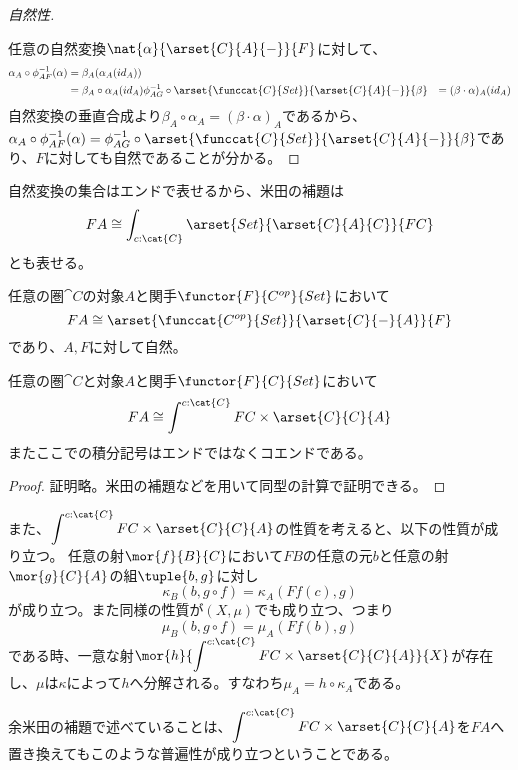 \documentclass[uplatex,dvipdfmx]{jsarticle}
\begin{document}
\begin{proof}[自然性]
\begin{center}
  \end{center}
  任意の自然変換$\nat{\alpha}{\arset{C}{A}{-}}{F}$に対して、
  \begin{align*}
    \alpha_A\circ\phi^{-1}_{AF}(\alpha) &= \beta_A(\alpha_A(id_A))\\
    &=\beta_A\circ\alpha_A(id_A)
    \phi^{-1}_{AG}\circ\arset{\funccat{C}{Set}}{\arset{C}{A}{-}}{\beta} &= (\beta\cdot\alpha)_A(id_A)\\
  \end{align*}
  自然変換の垂直合成より$\beta_A\circ\alpha_A=(\beta\cdot\alpha)_A$であるから、$\alpha_A\circ\phi^{-1}_{AF}(\alpha)=\phi^{-1}_{AG}\circ\arset{\funccat{C}{Set}}{\arset{C}{A}{-}}{\beta}$であり、$F$に対しても自然であることが分かる。
\end{proof}
自然変換の集合はエンドで表せるから、米田の補題は\[FA\cong\displaystyle\int_{c:\cat{C}} \arset{Set}{\arset{C}{A}{C}}{FC}\]とも表せる。
\begin{define}[反変米田の補題]
  任意の圏$\cat{C}$の対象$A$と関手$\functor{F}{C^{op}}{Set}$において
  \[FA\cong\arset{\funccat{C^{op}}{Set}}{\arset{C}{-}{A}}{F}\]であり、$A,F$に対して自然。
\end{define}
\begin{define}[余米田の補題]
  任意の圏$\cat{C}$と対象$A$と関手$\functor{F}{C}{Set}$において
  \[FA\cong\displaystyle\int^{c:\cat{C}}FC\times\arset{C}{C}{A}\]
  またここでの積分記号はエンドではなくコエンドである。
\end{define}
\begin{proof}
  証明略。米田の補題などを用いて同型の計算で証明できる。
\end{proof}
また、$\displaystyle\int^{c:\cat{C}}FC\times\arset{C}{C}{A}$の性質を考えると、以下の性質が成り立つ。
任意の射$\mor{f}{B}{C}$において$FB$の任意の元$b$と任意の射$\mor{g}{C}{A}$の組$\tuple{b,g}$に対し\[\kappa_B(b,g\circ f)=\kappa_A(Ff(c),g)\]が成り立つ。また同様の性質が$(X,\mu)$でも成り立つ、つまり\[\mu_B(b,g\circ f)=\mu_A(Ff(b),g)\]である時、一意な射$\mor{h}{\displaystyle\int^{c:\cat{C}}FC\times\arset{C}{C}{A}}{X}$が存在し、$\mu$は$\kappa$によって$h$へ分解される。すなわち$\mu_A = h\circ\kappa_A$である。
\begin{center}
\end{center}
余米田の補題で述べていることは、$\displaystyle\int^{c:\cat{C}}FC\times\arset{C}{C}{A}$を$FA$へ置き換えてもこのような普遍性が成り立つということである。
\end{document}
